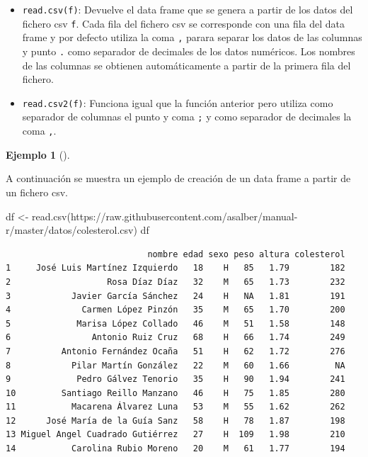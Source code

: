 \documentclass[
  a4paper,
]{scrreport}
\newenvironment{Shaded}{\begin{snugshade}}{\end{snugshade}}
\newcommand{\FunctionTok}[1]{\textcolor[rgb]{0.28,0.35,0.67}{#1}}
\newcommand{\NormalTok}[1]{\textcolor[rgb]{0.00,0.23,0.31}{#1}}
\newcommand{\OtherTok}[1]{\textcolor[rgb]{0.00,0.23,0.31}{#1}}
\newcommand{\StringTok}[1]{\textcolor[rgb]{0.13,0.47,0.30}{#1}}
\providecommand{\tightlist}{%
  \setlength{\itemsep}{0pt}\setlength{\parskip}{0pt}}\usepackage{longtable,booktabs,array}
\theoremstyle{definition}
\newtheorem{example}{Ejemplo}[chapter]
\theoremstyle{definition}
\theoremstyle{remark}
\begin{document}
\begin{itemize}
\tightlist
\item
  \texttt{read.csv(f)}: Devuelve el data frame que se genera a partir de
  los datos del fichero csv \texttt{f}. Cada fila del fichero csv se
  corresponde con una fila del data frame y por defecto utiliza la coma
  \texttt{,} parara separar los datos de las columnas y punto \texttt{.}
  como separador de decimales de los datos numéricos. Los nombres de las
  columnas se obtienen automáticamente a partir de la primera fila del
  fichero.
\item
  \texttt{read.csv2(f)}: Funciona igual que la función anterior pero
  utiliza como separador de columnas el punto y coma \texttt{;} y como
  separador de decimales la coma \texttt{,}.
\end{itemize}

\leavevmode{}%
\begin{example}[]\label{exm-creacion-data-frame-csv}

A continuación se muestra un ejemplo de creación de un data frame a
partir de un fichero csv.

\begin{Shaded}
\begin{Highlighting}[]
\NormalTok{df }\OtherTok{\textless{}{-}} \FunctionTok{read.csv}\NormalTok{(}\StringTok{\textquotesingle{}https://raw.githubusercontent.com/asalber/manual{-}r/master/datos/colesterol.csv\textquotesingle{}}\NormalTok{)}
\NormalTok{df}
\end{Highlighting}
\end{Shaded}

\begin{verbatim}
                            nombre edad sexo peso altura colesterol
1     José Luis Martínez Izquierdo   18    H   85   1.79        182
2                   Rosa Díaz Díaz   32    M   65   1.73        232
3            Javier García Sánchez   24    H   NA   1.81        191
4              Carmen López Pinzón   35    M   65   1.70        200
5             Marisa López Collado   46    M   51   1.58        148
6                Antonio Ruiz Cruz   68    H   66   1.74        249
7          Antonio Fernández Ocaña   51    H   62   1.72        276
8            Pilar Martín González   22    M   60   1.66         NA
9             Pedro Gálvez Tenorio   35    H   90   1.94        241
10         Santiago Reillo Manzano   46    H   75   1.85        280
11           Macarena Álvarez Luna   53    M   55   1.62        262
12      José María de la Guía Sanz   58    H   78   1.87        198
13 Miguel Angel Cuadrado Gutiérrez   27    H  109   1.98        210
14           Carolina Rubio Moreno   20    M   61   1.77        194
\end{verbatim}

\end{example}
\end{document}
